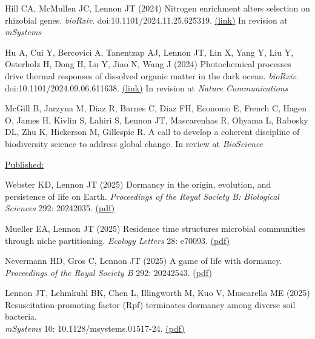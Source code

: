 \documentclass[11pt]{article}
\begin{document}
\begin{etaremune}
\item Hill CA, McMullen JC, Lennon JT (2024) Nitrogen enrichment alters selection on rhizobial genes. \textit{bioRxiv}. doi:10.1101/2024.11.25.625319. \href{https://www.biorxiv.org/content/10.1101/2024.11.25.625319v1.full.pdf}{(link)} In revision at \textit{mSystems}

\item Hu A, Cui Y, Bercovici A, Tanentzap AJ, Lennon JT, Lin X, Yang Y, Liu Y, Osterholz H, Dong H, Lu Y, Jiao N, Wang J (2024) Photochemical processes drive thermal responses of dissolved organic matter in the dark ocean. \textit{bioRxiv}. doi:10.1101/2024.09.06.611638. \href{https://www.biorxiv.org/content/10.1101/2024.09.06.611638v1.full.pdf}{(link)} In revision at \textit{Nature Communications}

\item McGill B, Jarzyna M, Diaz R, Barnes C, Diaz FH, Economo E, French C, Hagen O, James H, Kivlin S, Lahiri S, Lennon JT, Mascarenhas R, Ohyama L, Rabosky DL, Zhu K, Hickerson M, Gillespie R. A call to develop a coherent discipline of biodiversity science to address global change. In review at \textit{BioScience}

\vspace{1em}
\item[] \textnormal{\underline{Published:}}

\item Webster KD, Lennon JT (2025) Dormancy in the origin, evolution, and persistence of life on Earth. \textit{Proceedings of the Royal Society B: Biological Sciences} 292: 20242035. \href{https://lennonlab.github.io/assets/publications/Webster_Lennon_2025.pdf}{(pdf)}

\item Mueller EA, Lennon JT (2025) Residence time structures microbial communities through niche partitioning. \textit{Ecology Letters} 28: e70093. \href{https://lennonlab.github.io/assets/publications/Mueller_Lennon_2025.pdf}{(pdf)}

\item Nevermann HD, Gros C, Lennon JT (2025) A game of life with dormancy. \textit{Proceedings of the Royal Society B} 292: 20242543. \href{https://lennonlab.github.io/assets/publications/Nevermann_etal_2025.pdf}{(pdf)}

\item Lennon JT, Lehmkuhl BK, Chen L, Illingworth M, Kuo V, Muscarella ME (2025) \\Resuscitation-promoting factor (Rpf) terminates dormancy among diverse soil bacteria.\\
\textit{mSystems} 10: 10.1128/msystems.01517-24. \href{https://lennonlab.github.io/assets/publications/Lennon_etal_2025b.pdf}{(pdf)}


\end{etaremune}
\end{document}
